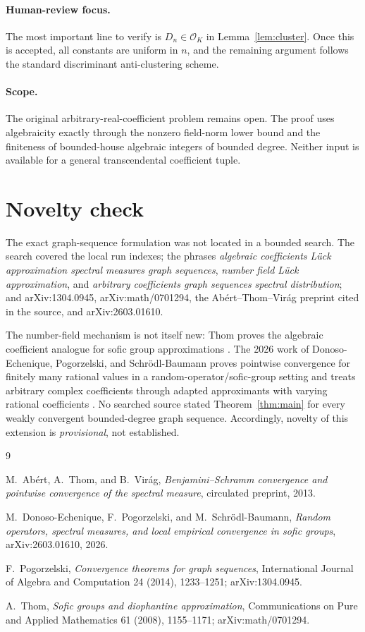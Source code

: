 \documentclass[11pt]{article}
\theoremstyle{definition}
\theoremstyle{remark}
\newcommand{\OK}{\mathcal{O}_K}
\begin{document}
\paragraph{Human-review focus.}
The most important line to verify is $D_n\in\OK$ in
Lemma~\ref{lem:cluster}.  Once this is accepted, all constants are uniform in
$n$, and the remaining argument follows the standard discriminant
anti-clustering scheme.

\paragraph{Scope.}
The original arbitrary-real-coefficient problem remains open.  The proof
uses algebraicity exactly through the nonzero field-norm lower bound and the
finiteness of bounded-house algebraic integers of bounded degree.  Neither
input is available for a general transcendental coefficient tuple.

\section{Novelty check}

The exact graph-sequence formulation was not located in a bounded search.
The search covered the local run indexes; the phrases \emph{algebraic
coefficients L\"uck approximation spectral measures graph sequences},
\emph{number field L\"uck approximation}, and \emph{arbitrary coefficients
graph sequences spectral distribution}; and arXiv:1304.0945,
arXiv:math/0701294, the Ab\'ert--Thom--Vir\'ag preprint cited in the source,
and arXiv:2603.01610.

The number-field mechanism is not itself new: Thom proves the algebraic
coefficient analogue for sofic group approximations
\cite{Thom}.  The 2026 work of Donoso-Echenique, Pogorzelski, and
Schr\"odl-Baumann proves pointwise convergence for finitely many rational
values in a random-operator/sofic-group setting and treats arbitrary complex
coefficients through adapted approximants with varying rational
coefficients \cite{DPS}.  No searched source stated Theorem~\ref{thm:main}
for every weakly convergent bounded-degree graph sequence.  Accordingly,
novelty of this extension is \emph{provisional}, not established.

\begin{thebibliography}{9}

M.~Ab\'ert, A.~Thom, and B.~Vir\'ag,
\emph{Benjamini--Schramm convergence and pointwise convergence of the
spectral measure}, circulated preprint, 2013.

M.~Donoso-Echenique, F.~Pogorzelski, and M.~Schr\"odl-Baumann,
\emph{Random operators, spectral measures, and local empirical convergence
in sofic groups}, arXiv:2603.01610, 2026.

F.~Pogorzelski,
\emph{Convergence theorems for graph sequences},
International Journal of Algebra and Computation 24 (2014), 1233--1251;
arXiv:1304.0945.

A.~Thom,
\emph{Sofic groups and diophantine approximation},
Communications on Pure and Applied Mathematics 61 (2008), 1155--1171;
arXiv:math/0701294.

\end{thebibliography}
\end{document}

